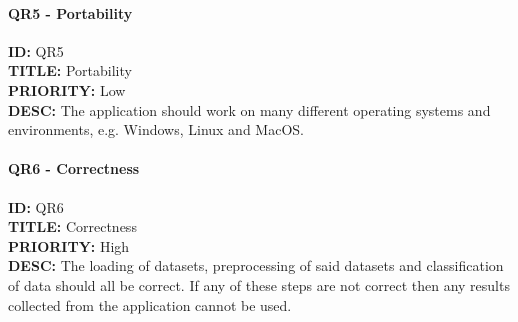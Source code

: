 \paragraph*{QR5 - Portability}
\textbf{ID:} QR5 \\
\textbf{TITLE:} Portability \\
\textbf{PRIORITY:} Low \\
\textbf{DESC:} The application should work on many different operating systems and environments, e.g. Windows, Linux and MacOS. \\
\paragraph*{QR6 - Correctness}
\textbf{ID:} QR6  \\
\textbf{TITLE:} Correctness \\
\textbf{PRIORITY:} High \\
\textbf{DESC:} The loading of datasets, preprocessing of said datasets and classification of data should all be correct. If any of these steps are not correct then any results collected from the application cannot be used. \\

